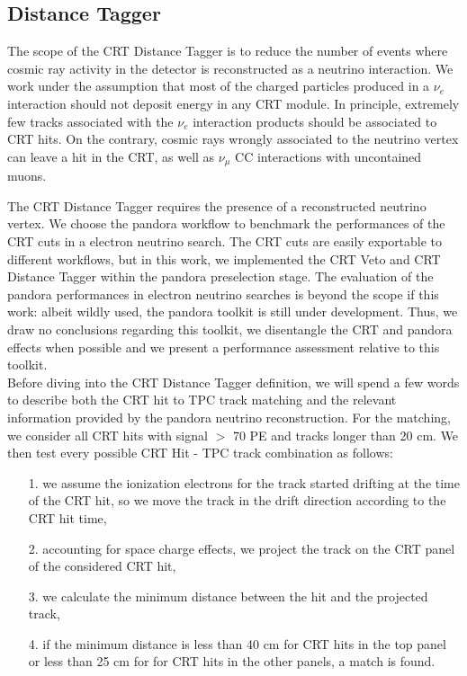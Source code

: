 \subsection{Distance Tagger}\label{sec:DistCuts}
The scope of the CRT Distance Tagger is to reduce the number of events where cosmic ray activity in the detector is reconstructed as a neutrino interaction. We work under the assumption that most of the charged particles produced in a $\nu_e$ interaction should not deposit energy in any CRT module. 
In principle, extremely few tracks associated with the $\nu_e$ interaction products should be associated to CRT hits. On the contrary, cosmic rays wrongly associated to the neutrino vertex can leave a hit in the CRT, as well as  $\nu_\mu$ CC interactions with uncontained  muons.

The CRT Distance Tagger requires the presence of a reconstructed neutrino vertex.  We choose the pandora workflow to benchmark the performances of the CRT cuts in a electron neutrino search. The CRT cuts are easily exportable to different workflows, but in this work, we implemented the CRT Veto and CRT Distance Tagger within the pandora preselection stage. The evaluation of the pandora performances in electron neutrino searches is beyond the scope if this work: albeit wildly used, the pandora toolkit is still under development. Thus, we draw no conclusions regarding this toolkit, we disentangle the CRT  and pandora effects when possible and we present a performance assessment relative to this toolkit.\\

Before diving into the CRT Distance Tagger definition, we will spend a few words to describe both the CRT hit to TPC track matching and the relevant information provided by the pandora neutrino reconstruction. For the matching, we consider all CRT hits with signal $>$ 70 PE  and tracks longer than 20 cm. We then test every possible CRT Hit - TPC track combination as follows: 
\begin{itemize}
\item[1.] we assume the ionization electrons for the track started drifting at the time of the CRT hit, so we move the track in the drift direction according to the CRT hit time, 
\item [2.] accounting for space charge effects, we project the track on the CRT panel of the considered CRT hit,
\item [3.] we calculate the minimum distance between the hit and the projected track,
\item [4.] if the minimum distance is less than 40 cm for CRT hits in the top panel or less than 25 cm for  for CRT hits in the other panels, a match is found. 
\end{itemize}

